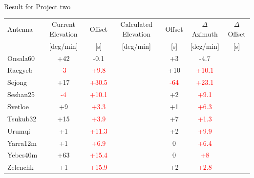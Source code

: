 \documentclass{beamer}
\begin{document}
    \begin{frame}{Result for Project two}
        \begin{tabular}{l | c c | c c |c c}
            Antenna & Current Elevation & Offset & Calculated Elevation &Offset & $\Delta$Azimuth & $\Delta$Offset \\ [-8pt]
                    & \tiny{[deg/min]}& \tiny{[s]}&\tiny{[deg/min]}&\tiny{[s]}&\tiny{[deg/min]}& \tiny{[s]} \\ \hline
            \hline
            Onsala60          & +42 & -0.1  &  & +3 &-4.7   \\
            Raegyeb           & \textcolor{red}{-3}  & \textcolor{red}{+9.8} & & +10  &\textcolor{red}{+10.1}  \\
            Sejong            & +17 & \textcolor{red}{+30.5} &  &\textcolor{red}{-64}& \textcolor{red}{+23.1}  \\
            Seshan25          & \textcolor{red}{-4}  & \textcolor{red}{+10.1} & & +2  &\textcolor{red}{+9.1}  \\
            Svetloe           & +9  & \textcolor{red}{+3.3} &  & +1 &\textcolor{red}{+6.3}  \\
            Tsukub32          & +15 & \textcolor{red}{+3.9}  &  & +7 &\textcolor{red}{+1.3}   \\
            Urumqi            & +1  & \textcolor{red}{+11.3} &  & +2&\textcolor{red}{+9.9}  \\
            Yarra12m          & +1  & \textcolor{red}{+6.9}  &  & 0  &\textcolor{red}{+6.4}   \\
            Yebes40m          & +63 & \textcolor{red}{+15.4} &  & 0&\textcolor{red}{+8}  \\
            Zelenchk          & +1  & \textcolor{red}{+15.9} &  & +2&\textcolor{red}{+2.8}  \\
        \end{tabular}
    \end{frame}
\end{document}
